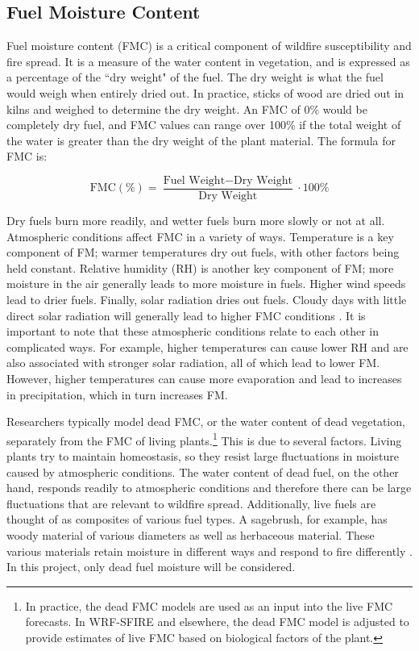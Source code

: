 \documentclass[11pt]{article}%
\begin{document}
\subsection{Fuel Moisture Content}

Fuel moisture content (FMC) is a critical component of wildfire susceptibility and fire spread. It is a measure of the water content in vegetation, and is expressed as a percentage of the ``dry weight" of the fuel. \cite{NCEI-2024-DFM} The dry weight is what the fuel would weigh when entirely dried out. In practice, sticks of wood are dried out in kilns and weighed to determine the dry weight. An FMC of 0\% would be completely dry fuel, and FMC values can range over 100\% if the total weight of the water is greater than the dry weight of the plant material. The formula for FMC is:

\begin{equation}
    \text{FMC} (\%) = \frac{\text{Fuel Weight} - \text{Dry Weight}}{\text{Dry Weight}} \cdot 100\%
\end{equation}

Dry fuels burn more readily, and wetter fuels burn more slowly or not at all. Atmospheric conditions affect FMC in a variety of ways. Temperature is a key component of FM; warmer temperatures dry out fuels, with other factors being held constant. Relative humidity (RH) is another key component of FM; more moisture in the air generally leads to more moisture in fuels. Higher wind speeds lead to drier fuels. Finally, solar radiation dries out fuels. Cloudy days with little direct solar radiation will generally lead to higher FMC conditions \cite{NWCG-2024-FWP}. It is important to note that these atmospheric conditions relate to each other in complicated ways. For example, higher temperatures can cause lower RH and are also associated with stronger solar radiation, all of which lead to lower FM. However, higher temperatures can cause more evaporation and lead to increases in precipitation, which in turn increases FM. 

Researchers typically model dead FMC, or the water content of dead vegetation, separately from the FMC of living plants.\footnote{In practice, the dead FMC models are used as an input into the live FMC forecasts. In WRF-SFIRE and elsewhere, the dead FMC model is adjusted to provide estimates of live FMC based on biological factors of the plant.} This is due to several factors. Living plants try to maintain homeostasis, so they resist large fluctuations in moisture caused by atmospheric conditions. The water content of dead fuel, on the other hand, responds readily to atmospheric conditions and therefore there can be large fluctuations that are relevant to wildfire spread. Additionally, live fuels are thought of as composites of various fuel types. A sagebrush, for example, has woody material of various diameters as well as herbaceous material. These various materials retain moisture in different ways and respond to fire differently \cite{NWCG-2024-FWP}. In this project, only dead fuel moisture will be considered. 
\end{document}
